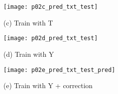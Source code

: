 \begin{answer}

    \begin{figure}[h]
        \centering
        \texttt{[image: p02c\_pred\_txt\_test]}
        \caption{(c) Train with T}
    \end{figure}

    \begin{figure}[h]
        \centering
        \texttt{[image: p02d\_pred\_txt\_test]}
        \caption{(d) Train with Y}
    \end{figure}

    \begin{figure}[h]
        \centering
        \texttt{[image: p02e\_pred\_txt\_test\_pred]}
        \caption{(e) Train with Y + correction}
    \end{figure}
\end{answer}
